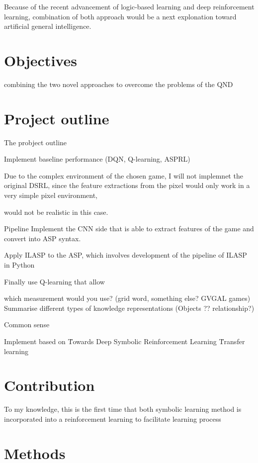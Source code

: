\documentclass[12pt,twoside]{report}
\begin{document}
Because of the recent advancement of logic-based learning and deep reinforcement learning, combination of both approach would be a next explonation toward artificial general intelligence.

\section{Objectives}

combining the two novel approaches to overcome the problems of the QND

\section{Project outline}

The probject outline

Implement baseline performance (DQN, Q-learning, ASPRL)

Due to the complex environment of the chosen game, I will not implemnet the original DSRL, since the feature extractions from the pixel would only work in a very simple pixel environment,

would not be realistic in this case.

Pipeline
Implement the CNN side that is able to extract features of the game and convert into ASP syntax.


Apply ILASP to the ASP, which involves development of the pipeline of ILASP in Python

Finally use Q-learning that allow

which measurement would you use? (grid word, something else? GVGAL games)
Summarise different types of knowledge representations (Objects ?? relationship?)

Common sense

Implement based on \"Towards Deep Symbolic Reinforcement Learning \"

Transfer learning

\section{Contribution}

To my knowledge, this is the first time that both symbolic learning method is incorporated into a reinforcement learning to facilitate learning process

\section{Methods}
\end{document}
